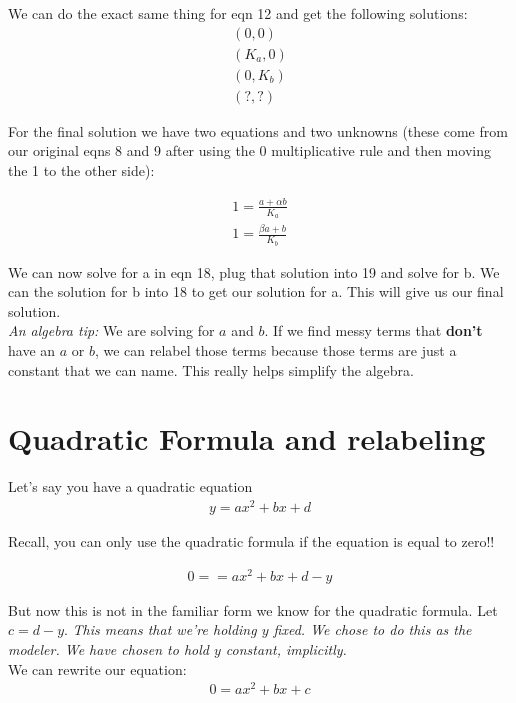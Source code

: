 \documentclass{article}
\begin{document}
We can do the exact same thing for eqn 12 and get the following solutions: 
\begin{align}
    (0, 0) \\
    (K_a, 0) \\
    (0, K_b) \\
    (?, ?)
\end{align}

For the final solution we have two equations and two unknowns (these come from our original eqns 8 and 9 after using the 0 multiplicative rule and then moving the 1 to the other side): 

\begin{align}
    1 = \frac{a + \alpha b}{K_a} \\
    1 = \frac{\beta a + b }{K_b}
\end{align}

We can now solve for a in eqn 18, plug that solution into 19 and solve for b. We can the solution for b into 18 to get our solution for a. This will give us our final solution.  \\

\textit{An algebra tip:} We are solving for $a$ and $b$. If we find messy terms that \textbf{don't} have an $a$ or $b$, we can relabel those terms because those terms are just a constant that we can name. This really helps simplify the algebra. 

\section{Quadratic Formula and relabeling}

Let's say you have a quadratic equation 
\begin{align}
    y = a x^2 + bx + d
\end{align}

Recall, you can only use the quadratic formula if the equation is equal to zero!! 

\begin{align}
    0 = = a x^2 + bx + d - y
\end{align}

But now this is not in the familiar form we know for the quadratic formula. Let $c = d-y$. \textit{This means that we're holding $y$ fixed. We chose to do this as the modeler. We have chosen to hold $y$ constant, implicitly.} \\

We can rewrite our equation: 
\begin{align}
    0 = a x^2 + bx + c
\end{align}
\end{document}
